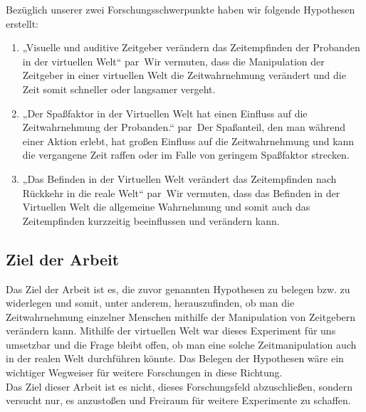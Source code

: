 \documentclass{Paper}
\begin{document}
Bezüglich unserer zwei Forschungsschwerpunkte haben wir folgende Hypothesen erstellt:
\begin{enumerate}
\item „Visuelle und auditive Zeitgeber verändern das Zeitempfinden der Probanden in der virtuellen Welt“
par\
Wir vermuten, dass die Manipulation der Zeitgeber in einer virtuellen Welt die Zeitwahrnehmung verändert und die Zeit somit schneller oder langsamer vergeht.

\item „Der Spaßfaktor in der Virtuellen Welt hat einen Einfluss auf die Zeitwahrnehmung der Probanden.“
par\
Der Spaßanteil, den man während einer Aktion erlebt, hat großen Einfluss auf die Zeitwahrnehmung und kann die vergangene Zeit raffen oder im Falle von geringem Spaßfaktor strecken.


\item „Das Befinden in der Virtuellen Welt verändert das Zeitempfinden nach Rückkehr in die reale Welt“
par\
Wir vermuten, dass das Befinden in der Virtuellen Welt die allgemeine Wahrnehmung und somit auch das Zeitempfinden kurzzeitig beeinflussen und verändern kann.
\end{enumerate}




\subsection{Ziel der Arbeit}
Das Ziel der Arbeit ist es, die zuvor genannten Hypothesen zu belegen bzw. zu widerlegen und somit, unter anderem, herauszufinden, ob man die Zeitwahrnehmung einzelner Menschen mithilfe der Manipulation von Zeitgebern verändern kann. Mithilfe der virtuellen Welt war dieses Experiment für uns umsetzbar und die Frage bleibt offen, ob man eine solche Zeitmanipulation auch in der realen Welt durchführen könnte. Das Belegen der Hypothesen wäre ein wichtiger Wegweiser für weitere Forschungen in diese Richtung.\\
Das Ziel dieser Arbeit ist es nicht, dieses Forschungsfeld abzuschließen, sondern versucht nur, es anzustoßen und Freiraum für weitere Experimente zu schaffen.
\end{document}
